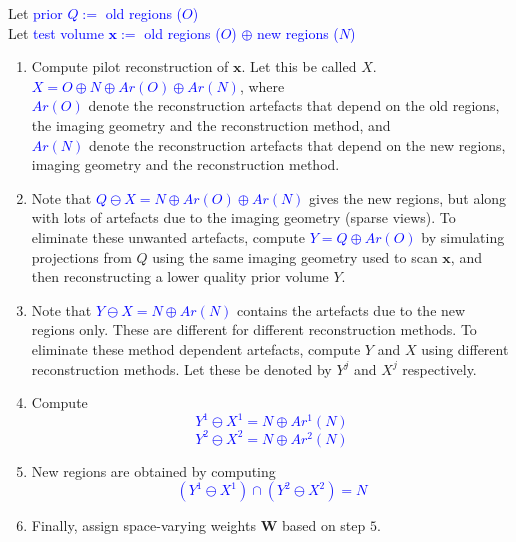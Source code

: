 \documentclass{article}
\begin{document}
\begin{boxedminipage}{\textwidth}
{\small
 Let \textcolor{blue}{prior $Q:=$ old regions ($O$)}\\
 Let \textcolor{blue}{test volume $\boldsymbol{x}:=$ old regions ($O$) $\oplus$ new regions ($N$)}\\
    \begin{enumerate}
\item  Compute pilot reconstruction of $\boldsymbol{x}$. Let this be called $X$.\\ \textcolor{blue}{$X = O \oplus N \oplus Ar(O) \oplus Ar(N)$}, where \\ \textcolor{blue}{$Ar(O)$} denote the reconstruction artefacts that depend on the old regions, the imaging geometry and the reconstruction method, and\\
 \textcolor{blue}{$Ar(N)$} denote the reconstruction artefacts that depend on the new regions, imaging geometry and the reconstruction method.
\item  Note that \textcolor{blue}{$Q \ominus X = N \oplus Ar(O) \oplus Ar(N)$} gives the new regions, but along with lots of artefacts due to the imaging geometry (sparse views). To eliminate these unwanted artefacts, compute \textcolor{blue}{$Y = Q \oplus Ar(O)$} by simulating projections from $Q$ using the same imaging geometry used to scan $\boldsymbol{x}$, and then reconstructing a lower quality prior volume $Y$. 
    \item Note that \textcolor{blue}{$Y \ominus X = N \oplus Ar(N)$} contains the artefacts due to the new regions only. These are different for different reconstruction methods. To eliminate these method dependent artefacts, compute $Y$ and $X$ using different reconstruction methods. Let these be denoted by $Y^j$ and $X^j$ respectively.
    \item Compute
\vspace{-0.2cm}
           \textcolor{blue}{\begin{equation*}
            Y^1 \ominus X^1 = N \oplus Ar^1(N)
           \end{equation*}
\vspace{-0.5cm}
           \begin{equation*}
            Y^2 \ominus X^2 = N \oplus Ar^2(N)
           \end{equation*}}
\vspace{-0.4cm}
   \item  New regions are obtained by computing
\vspace{-0.2cm}
          \textcolor{blue}{\begin{equation*}
          (Y^1 \ominus X^1)\cap(Y^2 \ominus X^2)= N
          \end{equation*}}   
\vspace{-0.5cm}
    \item Finally, assign space-varying weights $\boldsymbol{W}$ based on step $5$.
    \end{enumerate}
\label{algo:newRegionDetection}
}
\end{boxedminipage}
\end{document}
